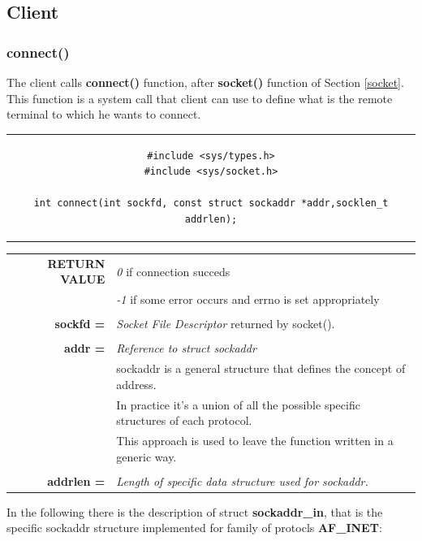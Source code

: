 \subsection{Client}
\subsubsection{connect()}
The client calls \textbf{connect()} function, after \textbf{socket()} function of Section \ref{socket}. This function is a system call that client can use to define what is the remote terminal to which he wants to connect.

\begin{center}
\begin{tabular}{c}
\begin{lstlisting}[linewidth=370pt, basicstyle=\footnotesize\sffamily,]
#include <sys/types.h>
#include <sys/socket.h>

int connect(int sockfd, const struct sockaddr *addr,socklen_t addrlen);
\end{lstlisting}
\end{tabular}
\end{center}

\begin{table}[h]
\centering
\begin{tabular}{rcl}
\textbf{RETURN VALUE} & \multicolumn{2}{l}{\textit{0} if connection succeds}\\
{} & \multicolumn{2}{l}{\textit{-1} if some error occurs and errno is set appropriately}\\
& & \\
\textbf{sockfd =} & \multicolumn{2}{l}{\textit{Socket File Descriptor} returned by socket().}\\
& &\\
\textbf{addr =} & \multicolumn{2}{l}{\textit{Reference to struct sockaddr}}\\
{} & \multicolumn{2}{l}{sockaddr is a general structure that defines the concept of address.}\\
{} & \multicolumn{2}{l}{In practice it's a union of all the possible specific structures of each protocol.}\\
{} & \multicolumn{2}{l}{This approach is used to leave the function written in a generic way.}\\
& & \\
\textbf{addrlen =} & \multicolumn{2}{l}{\textit{Length of specific data structure used for sockaddr.}}\\
\end{tabular}
\end{table}
\vspace{8cm}
In the following there is the description of struct \textbf{sockaddr\_in}, that is the specific sockaddr structure implemented for family of protocls \textbf{AF\_INET}:

